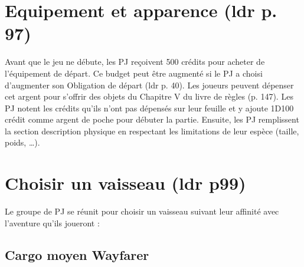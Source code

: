 \documentclass[twoside]{article}
\begin{document}
\section{Equipement et apparence (ldr p. 97)}
Avant que le jeu ne débute, les PJ reçoivent 500 crédits pour acheter de l'équipement de départ. Ce budget peut être augmenté si le PJ a choisi d'augmenter son Obligation de départ (ldr p. 40). Les joueurs peuvent dépenser cet argent pour s'offrir des objets du Chapitre V du livre de règles (p. 147). Les PJ notent les crédits qu'ils n'ont pas dépensés sur leur feuille et y ajoute 1D100 crédit comme argent de poche pour débuter la partie. Ensuite, les PJ remplissent la section description physique en respectant les limitations de leur espèce (taille, poids, \ldots).

\section{Choisir un vaisseau (ldr p99)}
Le groupe de PJ se réunit pour choisir un vaisseau suivant leur affinité avec l'aventure qu'ils joueront :

\subsection*{Cargo moyen Wayfarer}
\end{document}
